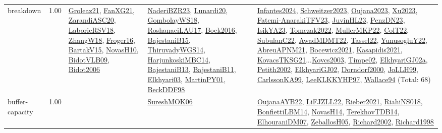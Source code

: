 {\begin{longtable}{p{3cm}r>{\raggedright\arraybackslash}p{6cm}>{\raggedright\arraybackslash}p{6cm}>{\raggedright\arraybackslash}p{8cm}}
\index{breakdown}\index{Concepts!breakdown}breakdown &  1.00 & \hyperref[detail:Groleaz21]{Groleaz21}, \hyperref[detail:FanXG21]{FanXG21}, \hyperref[detail:ZarandiASC20]{ZarandiASC20}, \hyperref[detail:LaborieRSV18]{LaborieRSV18}, \hyperref[detail:ZhangW18]{ZhangW18}, \hyperref[detail:Froger16]{Froger16}, \hyperref[detail:BartakV15]{BartakV15}, \hyperref[detail:NovasH10]{NovasH10}, \hyperref[detail:BidotVLB09]{BidotVLB09}, \hyperref[detail:Bidot2006]{Bidot2006} & \hyperref[detail:NaderiBZR23]{NaderiBZR23}, \hyperref[detail:Lunardi20]{Lunardi20}, \hyperref[detail:GombolayWS18]{GombolayWS18}, \hyperref[detail:RoshanaeiLAU17]{RoshanaeiLAU17}, \hyperref[detail:Boek2016]{Boek2016}, \hyperref[detail:BajestaniB15]{BajestaniB15}, \hyperref[detail:ThiruvadyWGS14]{ThiruvadyWGS14}, \hyperref[detail:HarjunkoskiMBC14]{HarjunkoskiMBC14}, \hyperref[detail:BajestaniB13]{BajestaniB13}, \hyperref[detail:BajestaniB11]{BajestaniB11}, \hyperref[detail:Elkhyari03]{Elkhyari03}, \hyperref[detail:MartinPY01]{MartinPY01}, \hyperref[detail:BeckDDF98]{BeckDDF98} & \hyperref[detail:Infantes2024]{Infantes2024}, \hyperref[detail:Schweitzer2023]{Schweitzer2023}, \hyperref[detail:Oujana2023]{Oujana2023}, \hyperref[detail:Xu2023]{Xu2023}, \hyperref[detail:Fatemi-AnarakiTFV23]{Fatemi-AnarakiTFV23}, \hyperref[detail:JuvinHL23]{JuvinHL23}, \hyperref[detail:PenzDN23]{PenzDN23}, \hyperref[detail:IsikYA23]{IsikYA23}, \hyperref[detail:Tomczak2022]{Tomczak2022}, \hyperref[detail:MullerMKP22]{MullerMKP22}, \hyperref[detail:ColT22]{ColT22}, \hyperref[detail:SubulanC22]{SubulanC22}, \hyperref[detail:AwadMDMT22]{AwadMDMT22}, \hyperref[detail:Tassel22]{Tassel22}, \hyperref[detail:YunusogluY22]{YunusogluY22}, \hyperref[detail:AbreuAPNM21]{AbreuAPNM21}, \hyperref[detail:Bocewicz2021]{Bocewicz2021}, \hyperref[detail:Kasapidis2021]{Kasapidis2021}, \hyperref[detail:KovacsTKSG21]{KovacsTKSG21}...\hyperref[detail:Kovcs2003]{Kovcs2003}, \hyperref[detail:Timpe02]{Timpe02}, \hyperref[detail:ElkhyariGJ02a]{ElkhyariGJ02a}, \hyperref[detail:Petith2002]{Petith2002}, \hyperref[detail:ElkhyariGJ02]{ElkhyariGJ02}, \hyperref[detail:Dorndorf2000]{Dorndorf2000}, \hyperref[detail:JoLLH99]{JoLLH99}, \hyperref[detail:CarlssonKA99]{CarlssonKA99}, \hyperref[detail:LeeKLKKYHP97]{LeeKLKKYHP97}, \hyperref[detail:Wallace94]{Wallace94} (Total: 68)\\
\index{buffer-capacity}\index{Concepts!buffer-capacity}buffer-capacity &  1.00 &  & \hyperref[detail:SureshMOK06]{SureshMOK06} & \hyperref[detail:OujanaAYB22]{OujanaAYB22}, \hyperref[detail:LiFJZLL22]{LiFJZLL22}, \hyperref[detail:Rieber2021]{Rieber2021}, \hyperref[detail:RiahiNS018]{RiahiNS018}, \hyperref[detail:BonfiettiLBM14]{BonfiettiLBM14}, \hyperref[detail:NovasH14]{NovasH14}, \hyperref[detail:TerekhovTDB14]{TerekhovTDB14}, \hyperref[detail:ElhouraniDM07]{ElhouraniDM07}, \hyperref[detail:ZeballosH05]{ZeballosH05}, \hyperref[detail:Richard2002]{Richard2002}, \hyperref[detail:Richard1998]{Richard1998}\\

\end{longtable}}

